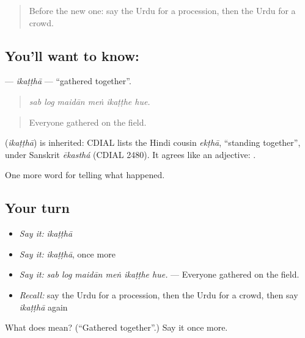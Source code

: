 \begin{quote}
Before the new one: say the Urdu for a procession, then the Urdu for a crowd.
\end{quote}

\subsection*{You'll want to know: }
\textbf{} — \emph{ikaṭṭhā} — \textquotedblleft{}gathered together\textquotedblright{}.

\begin{quote}
     
\end{quote}

\begin{quote}
\emph{sab log maidān meṅ ikaṭṭhe hue.}
\end{quote}

\begin{quote}
Everyone gathered on the field.
\end{quote}

\begin{cousinweb}
\textbf{} (\emph{ikaṭṭhā}) is inherited: CDIAL lists the Hindi cousin \emph{ekṭhā}, \textquotedblleft{}standing together\textquotedblright{}, under Sanskrit \emph{ēkasthá} (CDIAL 2480). It agrees like an adjective: \textbf{ }.
\end{cousinweb}

\begin{grammarlens}[title={What you've built}]
One more word for telling what happened.
\end{grammarlens}

\subsection*{Your turn}
\begin{itemize}
\raggedright
  \item \emph{Say it:} \emph{ikaṭṭhā}
  \item \emph{Say it:} \emph{ikaṭṭhā}, once more
  \item \emph{Say it:} \emph{sab log maidān meṅ ikaṭṭhe hue.} — Everyone gathered on the field.
  \item \emph{Recall:} say the Urdu for a procession, then the Urdu for a crowd, then say \emph{ikaṭṭhā} again
\end{itemize}

\begin{tcolorbox}[breakable,colback=teal!4,colframe=teal!35!black,title={Before you move on}]
What does  mean? (\textquotedblleft{}Gathered together\textquotedblright{}.) Say it once more.
\end{tcolorbox}
